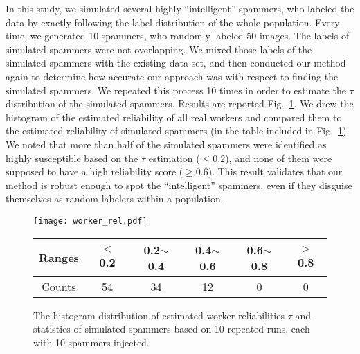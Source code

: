 \documentclass[10pt,journal,letterpaper,compsoc,twoside]{IEEEtran}
\begin{document}
In this study, we simulated several highly ``intelligent'' spammers, who labeled the data
by exactly following the label distribution of the whole population. 
Every time, we generated 10 spammers, who randomly labeled 50 images. 
The labels of simulated spammers were not overlapping. 
We mixed those labels of the simulated spammers 
with the existing data set, and then conducted our method again to determine 
how accurate our approach was with respect to finding the simulated spammers. 
We repeated this process 10 times in order to estimate the $\tau$ 
distribution of the simulated spammers. Results are reported Fig.~\ref{fig:simulated}.
We drew the histogram of the estimated reliability of all real workers
and compared them to the estimated reliability of simulated spammers (in the table included in Fig.~\ref{fig:simulated}).
We noted that more than half of the simulated spammers were identified as highly susceptible
based on the $\tau$ estimation ($\le 0.2$), and none of them were supposed 
to have a high reliability score ($\ge 0.6$). This result validates that our method
is robust enough to spot the ``intelligent'' spammers, even if they disguise themselves
as random labelers within a population.
\begin{figure}[htp]
\texttt{[image: worker\_rel.pdf]}
\begin{tabular}{|c|c|c|c|c|c|}\hline 
Ranges & $\le$ 0.2 & 0.2$\sim$0.4 & 0.4$\sim$0.6 & 0.6$\sim$0.8 & $\ge$0.8\\\hline
Counts & 54 & 34 & 12 & 0 & 0 \\\hline
\end{tabular}
\caption{The histogram distribution of estimated worker reliabilities $\tau$
and statistics of simulated spammers based on 10 repeated runs, each with 10 spammers injected.}
\label{fig:simulated}
\end{figure}
\end{document}
